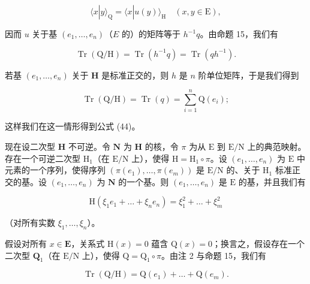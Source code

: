 \[
\langle x | y \rangle_ {\mathrm{Q}} = \langle x | u (y) \rangle_ {\mathrm{H}} \quad (x, y \in \mathrm{E}),
\]

因而 \(u\) 关于基 \((e_1, \ldots, e_n)\)（\(E\) 的）的矩阵等于 \(h^{-1}q\)。由命题 15，我们有

\[
\operatorname{Tr} (\mathrm{Q} / \mathrm{H}) = \operatorname{Tr} (h ^ {- 1} q) = \operatorname{Tr} (q h ^ {- 1}).\tag{45}
\]

若基 \((e_1, \dots, e_n)\) 关于 \(\mathbf{H}\) 是标准正交的，则 \(h\) 是 \(n\) 阶单位矩阵，于是我们得到

\[
\operatorname{Tr} (\mathrm{Q} / \mathrm{H}) = \operatorname{Tr} (q) = \sum_ {i = 1} ^ {n} \mathrm{Q} (e _ {i});
\]

这样我们在这一情形得到公式 (44)。

现在设二次型 \(\mathbf{H}\) 不可逆。令 \(\mathbf{N}\) 为 \(\mathbf{H}\) 的核，令 \(\pi\) 为从 \(\mathrm{E}\) 到 \(\mathrm{E} / \mathrm{N}\) 上的典范映射。存在一个可逆二次型 \(\mathrm{H}_1\)（在 \(\mathrm{E} / \mathrm{N}\) 上），使得 \(\mathrm{H} = \mathrm{H}_1 \circ \pi\)。设 \((e_1, \dots, e_n)\) 为 \(\mathrm{E}\) 中元素的一个序列，使得序列 \((\pi(e_1), \dots, \pi(e_m))\) 是 \(\mathrm{E} / \mathrm{N}\) 的、关于 \(\mathrm{H}_1\) 标准正交的基。设 \((e_1, \dots, e_n)\) 为 \(\mathbf{N}\) 的一个基。则 \((e_1, \dots, e_n)\) 是 \(\mathrm{E}\) 的基，并且我们有

\[
\mathrm{H} \left(\xi_ {1} e _ {1} + \dots + \xi_ {n} e _ {n}\right) = \xi_ {1} ^ {2} + \dots + \xi_ {m} ^ {2}\tag{46}
\]

（对所有实数 \(\xi_1, \ldots, \xi_n\)）。

假设对所有 \(x \in \mathbf{E}\)，关系式 \(\mathrm{H}(x) = 0\) 蕴含 \(\mathrm{Q}(x) = 0\)；换言之，假设存在一个二次型 \(\mathbf{Q}_1\)（在 \(\mathrm{E} / \mathrm{N}\) 上），使得 \(\mathrm{Q} = \mathrm{Q}_1 \circ \pi\)。由注 2 与命题 15，我们有

\[
\operatorname{Tr} (\mathrm{Q} / \mathrm{H}) = \mathrm{Q} (e _ {1}) + \dots + \mathrm{Q} (e _ {m}).\tag{47}
\]

\exercisesheading
